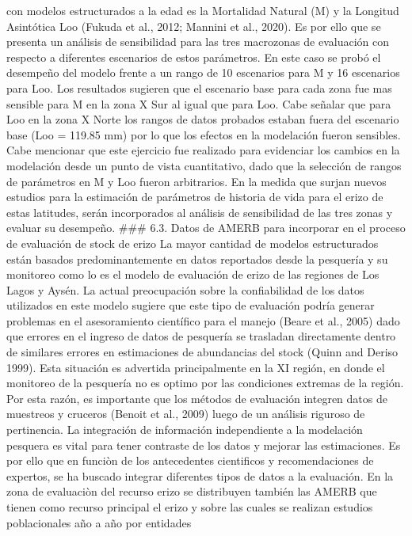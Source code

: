 \documentclass[
]{article}
\begin{document}
con modelos estructurados a la edad es la Mortalidad Natural (M) y la
Longitud Asintótica Loo (Fukuda et al., 2012; Mannini et al., 2020). Es
por ello que se presenta un análisis de sensibilidad para las tres
macrozonas de evaluación con respecto a diferentes escenarios de estos
parámetros. En este caso se probó el desempeño del modelo frente a un
rango de 10 escenarios para M y 16 escenarios para Loo. Los resultados
sugieren que el escenario base para cada zona fue mas sensible para M en
la zona X Sur al igual que para Loo. Cabe señalar que para Loo en la
zona X Norte los rangos de datos probados estaban fuera del escenario
base (Loo = 119.85 mm) por lo que los efectos en la modelación fueron
sensibles. Cabe mencionar que este ejercicio fue realizado para
evidenciar los cambios en la modelación desde un punto de vista
cuantitativo, dado que la selección de rangos de parámetros en M y Loo
fueron arbitrarios. En la medida que surjan nuevos estudios para la
estimación de parámetros de historia de vida para el erizo de estas
latitudes, serán incorporados al análisis de sensibilidad de las tres
zonas y evaluar su desempeño. \#\#\# 6.3. Datos de AMERB para incorporar
en el proceso de evaluación de stock de erizo La mayor cantidad de
modelos estructurados están basados predominantemente en datos
reportados desde la pesquería y su monitoreo como lo es el modelo de
evaluación de erizo de las regiones de Los Lagos y Aysén. La actual
preocupación sobre la confiabilidad de los datos utilizados en este
modelo sugiere que este tipo de evaluación podría generar problemas en
el asesoramiento científico para el manejo (Beare et al., 2005) dado que
errores en el ingreso de datos de pesquería se trasladan directamente
dentro de similares errores en estimaciones de abundancias del stock
(Quinn and Deriso 1999). Esta situación es advertida principalmente en
la XI región, en donde el monitoreo de la pesquería no es optimo por las
condiciones extremas de la región. Por esta razón, es importante que los
métodos de evaluación integren datos de muestreos y cruceros (Benoit et
al., 2009) luego de un análisis riguroso de pertinencia. La integración
de información independiente a la modelación pesquera es vital para
tener contraste de los datos y mejorar las estimaciones. Es por ello que
en funciòn de los antecedentes cientificos y recomendaciones de
expertos, se ha buscado integrar diferentes tipos de datos a la
evaluación. En la zona de evaluaciòn del recurso erizo se distribuyen
también las AMERB que tienen como recurso principal el erizo y sobre las
cuales se realizan estudios poblacionales año a año por entidades
\end{document}
